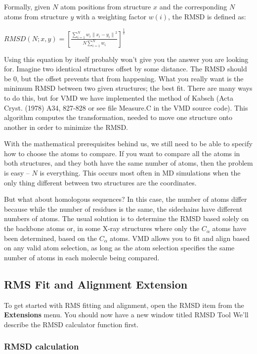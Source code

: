 Formally, given $N$ atom positions from structure $x$ and the
corresponding $N$ atoms from structure $y$ with a weighting factor
\(w\left(i\right)\),
the RMSD is defined as:
\begin{center}
\(
RMSD\left(N; x,y\right) = {\left[\frac {\sum_{i=1}^N
w_i {\parallel x_i - y_i \parallel}^2}
{N \sum_{i=1}^N w_i}\right]}^{\frac {1}{2}}
\)
\end{center}

Using this equation by itself probably won't give you the answer you
are looking for.  Imagine two identical structures offset by some
distance.  The RMSD should be 0, but the offset prevents that from
happening.  What you really want is the minimum RMSD between two given
structures; the best fit.  There are many ways to do this, but for VMD
we have implemented the method of Kabsch (Acta Cryst. (1978) A34,
827-828 or see file Measure.C in the VMD source code).
This algorithm computes the transformation, needed to move one structure
onto another in order to minimize the RMSD.

With the mathematical prerequisites behind us, we still need to be
able to specify how to choose the atoms to compare.  If you want to
compare all the atoms in both structures, and they both have the same
number of atoms, then the problem is easy -- $N$ is everything.  This
occurs most often in MD simulations when the only thing different
between two structures are the coordinates.

But what about homologous sequences?  In this case, the number of
atoms differ because while the number of residues is the same, the
sidechains have different numbers of atoms.  The usual solution is to
determine the RMSD based solely on the backbone atoms or, in some
X-ray structures where only the $C_{\alpha}$ atoms have been
determined, based on the $C_{\alpha}$ atoms.  VMD allows you to fit 
and align based on any valid atom selection, as long as the atom selection
specifies the same number of atoms in each molecule being compared.

\subsection{RMS Fit and Alignment Extension}

To get started with RMS fitting and alignment, 
open the RMSD item from the {\bf Extensions} menu.
You should now have a new window titled RMSD Tool
We'll describe the RMSD calculator function first.

\subsubsection{RMSD calculation}

